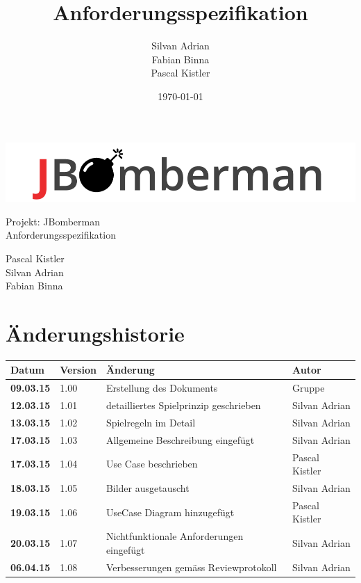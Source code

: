 \documentclass[11pt]{scrartcl}
\title{Anforderungsspezifikation}
\author{Silvan Adrian \\ Fabian Binna \\ Pascal Kistler}
\date{\today{}}
\begin{document}
\def\arraystretch{1.5}
\begin{titlepage}
\begin{center}
\vspace{10em}
\includegraphics[scale=2]{jbomberman}
\vspace{10em}
\end{center}
\begin{center}
\huge {Projekt: JBomberman} \\
\huge {Anforderungsspezifikation}
\end{center}
\begin{center}
\vspace{10em}
\LARGE {Pascal Kistler} \\
\LARGE {Silvan Adrian} \\
\LARGE {Fabian Binna}
\end{center}

\end{titlepage}

\newpage
\section{Änderungshistorie}
\label{sec:Änderungen}

\begin{tabularx}{\linewidth}{l l l l}
\textbf{Datum} & \textbf{Version} & \textbf{Änderung}  & \textbf{Autor} \\
\hline
\textbf{09.03.15} & 1.00 & Erstellung des Dokuments & Gruppe \\
\textbf{12.03.15} & 1.01 & detailliertes Spielprinzip geschrieben & Silvan Adrian \\
\textbf{13.03.15} & 1.02 & Spielregeln im Detail & Silvan Adrian \\
\textbf{17.03.15} & 1.03 & Allgemeine Beschreibung eingefügt & Silvan Adrian \\
\textbf{17.03.15} & 1.04 & Use Case beschrieben  & Pascal Kistler \\
\textbf{18.03.15} & 1.05 & Bilder ausgetauscht & Silvan Adrian \\
\textbf{19.03.15} & 1.06 & UseCase Diagram hinzugefügt & Pascal Kistler \\
\textbf{20.03.15} & 1.07 & Nichtfunktionale Anforderungen eingefügt & Silvan Adrian \\
\textbf{06.04.15} & 1.08 & Verbesserungen gemäss Reviewprotokoll & Silvan Adrian \\
\end{tabularx}
\end{document}
